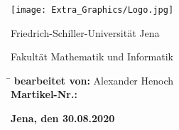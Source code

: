 \begin{titlepage}
    
    \centering 
    \texttt{[image: Extra\_Graphics/Logo.jpg]}
    
    \vspace{5cm}
    
    {\large Friedrich-Schiller-Universität Jena}
      
    {\large Fakultät Mathematik und Informatik}
    
    \vfill
    
    \flushleft
    
    \begin{nstabbing}
        \hspace{0.25\textwidth} \= \kill
        \textbf{bearbeitet von:} \> Alexander Henoch\\
        \textbf{Martikel-Nr.:} 
    \end{nstabbing}
    
    \vspace{2cm}
    
    \textbf{Jena, den 30.08.2020}
    
\end{titlepage}